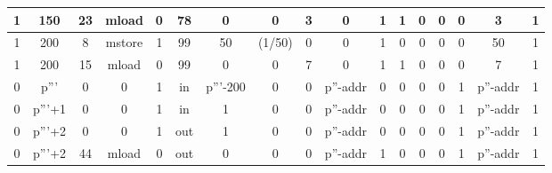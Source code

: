 \begin{table}[!ht]
\begin{adjustwidth}{-1.75cm}{}
\begin{tabular}{|c|c|c|c|c|c|c|c|c|c|c|c|c|c|c|c|c|}
            \hline
            \rowcolor{green!20} 1      & 150    & 23    & mload  & 0         & 78    & 0                              & 0                           & 3                           & \cellcolor{lightgray} 0 & \cellcolor{violet!30} 1     & 1     & \cellcolor{pink} 0     & \cellcolor{pink} 0     & \cellcolor{pink} 0     & 3        & 1     \\
            \hline
            \rowcolor{green!20} 1      & 200    & 8     & mstore & 1         & 99    & 50                             & (1/50)                      & \cellcolor{lightgray} 0     & \cellcolor{lightgray} 0 & \cellcolor{violet!30} 1     & 0     & \cellcolor{pink} 0     & \cellcolor{pink} 0     & \cellcolor{pink} 0     & 50       & 1     \\
            \hline
            \rowcolor{green!20} 1      & 200    & 15    & mload  & 0         & 99    & 0                              & 0                           & 7                           & \cellcolor{lightgray} 0 & \cellcolor{violet!30} 1     & 1     & \cellcolor{pink} 0     & \cellcolor{pink} 0     & \cellcolor{pink} 0     & 7        & 1     \\
            \hline
            \rowcolor{yellow!20} 0     & p'''   & 0     & 0      & 1         & in    & \cellcolor{lightgray} p'''-200 & \cellcolor{lightgray} 0     & \cellcolor{lightgray} 0     & p''-addr                & \cellcolor{violet!30} 0     & 0     & \cellcolor{pink} 0     & \cellcolor{pink} 0     & \cellcolor{pink} 1     & p''-addr & 1     \\
            \hline
            \rowcolor{yellow!20} 0     & p'''+1 & 0     & 0      & 1         & in    & \cellcolor{lightgray} 1        & \cellcolor{lightgray} 0     & \cellcolor{lightgray} 0     & p''-addr                & \cellcolor{violet!30} 0     & 0     & \cellcolor{pink} 0     & \cellcolor{pink} 0     & \cellcolor{pink} 1     & p''-addr & 1     \\
            \hline
            \rowcolor{yellow!20} 0     & p'''+2 & 0     & 0      & 1         & out   & \cellcolor{lightgray} 1        & \cellcolor{lightgray} 0     & \cellcolor{lightgray} 0     & p''-addr                & \cellcolor{violet!30} 0     & 0     & \cellcolor{pink} 0     & \cellcolor{pink} 0     & \cellcolor{pink} 1     & p''-addr & 1     \\
            \hline
            \rowcolor{yellow!20} 0     & p'''+2 & 44    & mload  & 0         & out   & \cellcolor{lightgray} 0        & \cellcolor{lightgray} 0     & \cellcolor{lightgray} 0     & p''-addr                & \cellcolor{violet!30} 1     & 0     & \cellcolor{pink} 0     & \cellcolor{pink} 0     & \cellcolor{pink} 1     & p''-addr & 1     \\

\end{tabular}
\end{adjustwidth}
\end{table}
